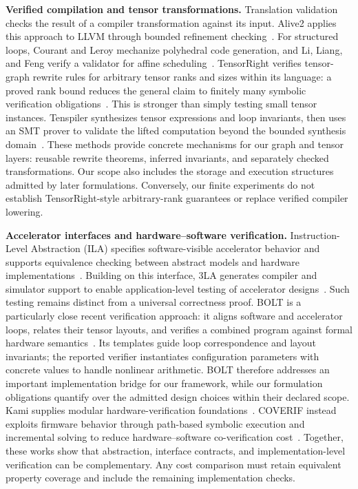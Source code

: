 \documentclass[11pt]{article}
\begin{document}
\textbf{Verified compilation and tensor transformations.}
Translation validation checks the result of a compiler transformation against its input. Alive2 applies this approach to LLVM through bounded refinement checking~\cite{alive2}. For structured loops, Courant and Leroy mechanize polyhedral code generation, and Li, Liang, and Feng verify a validator for affine scheduling~\cite{polygen,polcert}. TensorRight verifies tensor-graph rewrite rules for arbitrary tensor ranks and sizes within its language: a proved rank bound reduces the general claim to finitely many symbolic verification obligations~\cite{tensorright}. This is stronger than simply testing small tensor instances. Tenspiler synthesizes tensor expressions and loop invariants, then uses an SMT prover to validate the lifted computation beyond the bounded synthesis domain~\cite{tenspiler}. These methods provide concrete mechanisms for our graph and tensor layers: reusable rewrite theorems, inferred invariants, and separately checked transformations. Our scope also includes the storage and execution structures admitted by later formulations. Conversely, our finite experiments do not establish TensorRight-style arbitrary-rank guarantees or replace verified compiler lowering.

\textbf{Accelerator interfaces and hardware--software verification.}
Instruction-Level Abstraction (ILA) specifies software-visible accelerator behavior and supports equivalence checking between abstract models and hardware implementations~\cite{ila}. Building on this interface, 3LA generates compiler and simulator support to enable application-level testing of accelerator designs~\cite{threela}. Such testing remains distinct from a universal correctness proof. BOLT is a particularly close recent verification approach: it aligns software and accelerator loops, relates their tensor layouts, and verifies a combined program against formal hardware semantics~\cite{bolt}. Its templates guide loop correspondence and layout invariants; the reported verifier instantiates configuration parameters with concrete values to handle nonlinear arithmetic. BOLT therefore addresses an important implementation bridge for our framework, while our formulation obligations quantify over the admitted design choices within their declared scope. Kami supplies modular hardware-verification foundations~\cite{kami}. COVERIF instead exploits firmware behavior through path-based symbolic execution and incremental solving to reduce hardware--software co-verification cost~\cite{coverif}. Together, these works show that abstraction, interface contracts, and implementation-level verification can be complementary. Any cost comparison must retain equivalent property coverage and include the remaining implementation checks.
\end{document}
